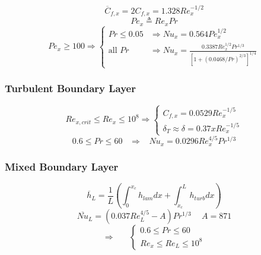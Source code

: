 \documentclass[twocolumn, 12pt]{article}
\begin{document}
\begin{equation*}
    \overline{C}_{f,x} = 2 C_{f,x} = 1.328Re_x^{-1/2}
\end{equation*}
\begin{equation*}
    Pe_x \triangleq Re_xPr
\end{equation*}
\[
    Pe_x \geq 100 \Rightarrow
    \begin{cases}
        Pr \leq 0.05  &\Rightarrow  Nu_x  = 0.564Pe_x^{1/2}\\
        \text{all } Pr  &\Rightarrow Nu_x = \frac{ 0.3387 Re_x^{1/2} Pr^{1/3}}{ [1 +(0.0468/Pr)^{2/3}]^{1/4}}
    \end{cases}
\]

\subsubsection*{Turbulent Boundary Layer}
\[
    Re_{x,crit} \leq Re_x \leq 10^8 \Longrightarrow
    \begin{cases}
        C_{f,x} = 0.0529 Re_x^{-1/5}\\
        \delta_T \approx \delta = 0.37xRe_x^{-1/5}
    \end{cases}
\]
\begin{equation*}
    0.6 \leq Pr \leq 60  \hspace{10pt} \Longrightarrow \hspace{10pt}Nu_x =0.0296 Re_x^{4/5}Pr^{1/3} 
\end{equation*}



\subsubsection*{Mixed Boundary Layer}
\begin{equation*}
    \overline{h}_L = \frac{1}{L} \left( \int_0^{x_c} h_{lam} dx +\int_{x_c}^L h_{turb}dx \right)
\end{equation*}
\begin{equation*}
    \overline{Nu}_L = (0.037 Re_L^{4/5} - A) Pr^{1/3}  \hspace{15pt} A  = 871
\end{equation*}
\[
    \Longrightarrow  \hspace{20pt}
    \begin{cases}
        0.6 \leq Pr \leq 60\\
        Re_x \leq Re_L \leq 10^8
    \end{cases}
\]
\end{document}
